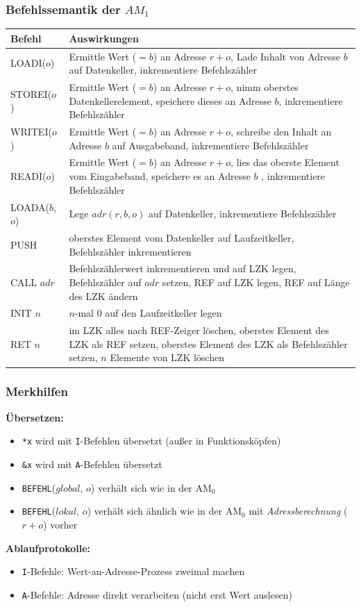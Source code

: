\documentclass{beamer}
\renewcommand{\emph}[1]{\textbf{#1}}
\begin{document}
\begin{frame} \frametitle{Befehlssemantik der $AM_1$}
	\scriptsize		
	\begin{tabular}{p{2cm} p{\dimexpr\linewidth-\fboxrule-\fboxsep-2cm}}
		\emph{Befehl} & \emph{Auswirkungen}  \\ \hline
		LOADI($o$) & Ermittle Wert ($=b$) an Adresse $r+o$, Lade Inhalt
		von Adresse $b$ auf Datenkeller, inkrementiere Befehlszähler \\
		STOREI($o$) & Ermittle Wert ($=b$) an Adresse $r+o$, nimm
		oberstes Datenkellerelement, speichere dieses an
		Adresse $b$, inkrementiere Befehlszähler \\
		WRITEI($o$) & Ermittle Wert ($=b$) an Adresse $r+o$, schreibe den
		Inhalt an Adresse $b$ auf Ausgabeband, inkrementiere Befehlszähler \\
		READI($o$) & Ermittle Wert ($=b$) an Adresse $r+o$, lies das oberste
		Element vom Eingabeband, speichere es an Adresse $b$ , inkrementiere Befehlszähler \\
		LOADA($b$,$o$) & Lege $adr(r,b,o)$ auf Datenkeller, inkrementiere Befehlszähler \\			
		PUSH & oberstes Element vom Datenkeller auf Laufzeitkeller, Befehlszähler inkrementieren \\
		CALL $adr$ & Befehlszählerwert inkrementieren und auf LZK legen, Befehlszähler auf $adr$ setzen, REF auf LZK legen, REF auf Länge des LZK ändern \\
		INIT $n$ & $n$-mal $0$ auf den Laufzeitkeller legen \\
		RET $n$ & im LZK alles nach REF-Zeiger löschen, oberstes Element des LZK als REF setzen, oberstes Element des LZK als Befehlszähler setzen, $n$ Elemente von LZK löschen
	\end{tabular}
\end{frame}

\begin{frame} \frametitle{Merkhilfen}
	\footnotesize
	\textbf{Übersetzen:}
	\begin{itemize}
		\item \texttt{*x} wird mit \texttt{I}-Befehlen übersetzt (außer in Funktionsköpfen)
		\item \texttt{\&x} wird mit \texttt{A}-Befehlen übersetzt
		\item \texttt{BEFEHL}($global$, $o$) verhält sich wie in der AM${}_\text{0}$
		\item \texttt{BEFEHL}($lokal$, $o$) verhält sich ähnlich wie in der AM${}_\text{0}$ mit \textit{Adressberechnung} ($r+o$) vorher
	\end{itemize}

	\pause 
	
	\textbf{Ablaufprotokolle:}
	\begin{itemize}
		\item \texttt{I}-Befehle: Wert-an-Adresse-Prozess zweimal machen
		\item \texttt{A}-Befehle: Adresse direkt verarbeiten (nicht erst Wert auslesen)
	\end{itemize}
\end{frame}
\end{document}
